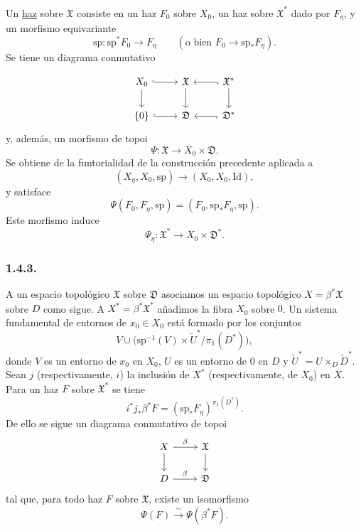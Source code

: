 Un \underline{haz} sobre $\mathfrak X$ consiste en un haz $F_0$ sobre $X_0$,
un haz sobre $\mathfrak X^*$ dado por $F_\eta$, y un morfismo equivariante
\[
\mathrm{sp}:\mathrm{sp}^*F_0\longrightarrow F_\eta
\qquad
(\text{o bien }F_0\longrightarrow\mathrm{sp}_*F_\eta).
\]
Se tiene un diagrama conmutativo

\pageoriginale

\[
\begin{tikzcd}
X_0 \arrow[r, hook] \arrow[d]
  & \mathfrak X \sisi{\arrow[d, dash]}{\arrow[d]}
  & \mathfrak X^* \arrow[l, hook] \arrow[d] \\
\{0\} \arrow[r, hook]
  & \mathfrak D
  & \mathfrak D^* \arrow[l, hook]
\end{tikzcd}
\]
y, además, un morfismo de topoi
\[
\Psi:\mathfrak X\longrightarrow X_0\times\mathfrak D.
\]
Se obtiene de la funtorialidad de la construcción precedente aplicada a
\[
(X_\eta,X_0,\mathrm{sp})
\longrightarrow(X_0,X_0,\mathrm{Id}),
\]
y satisface
\[
\Psi(F_0,F_\eta,\mathrm{sp})
=(F_0,\mathrm{sp}_*F_\eta,\mathrm{sp}).
\]
Este morfismo induce
\[
\Psi_\eta:\mathfrak X^*\longrightarrow X_0\times\mathfrak D^*.
\]

\subsubsection*{1.4.3.}
A un espacio topológico $\mathfrak X$ sobre $\mathfrak D$ asociamos un espacio
topológico $X=\beta^*\mathfrak X$ sobre $D$ como sigue. A
$X^*=\beta^*\mathfrak X^*$ añadimos la fibra $X_0$ sobre $0$. Un sistema
fundamental de entornos de $x_0\in X_0$ está formado por los conjuntos
\[
V\cup
\bigl(\mathrm{sp}^{-1}(V)\times\widetilde U^*/\pi_1(D^*)\bigr),
\]
donde $V$ es un entorno de $x_0$ en $X_0$, $U$ es un entorno de $0$ en $D$ y
$\widetilde U^*=U\times_D\widetilde D^*$. Sean $j$ (respectivamente, $i$) la
inclusión de $X^*$ (respectivamente, de $X_0$) en $X$. Para un haz $F$ sobre
$\mathfrak X^*$ se tiene
\[
i^*j_*\beta^*F
=(\mathrm{sp}_*F_\eta)^{\pi_1(D^*)}.
\]
De ello se sigue un diagrama conmutativo de topoi
\[
\begin{tikzcd}
X \arrow[r, "\beta"] \arrow[d]
  & \mathfrak X \arrow[d] \\
D \arrow[r, "\beta"]
  & \mathfrak D
\end{tikzcd}
\]
tal que, para todo haz $F$ sobre $\mathfrak X$, existe un isomorfismo
\begin{equation}\tag{1.4.3.1}
\Psi(F)\xrightarrow{\ \sim\ }\Psi(\beta^*F).
\end{equation}

